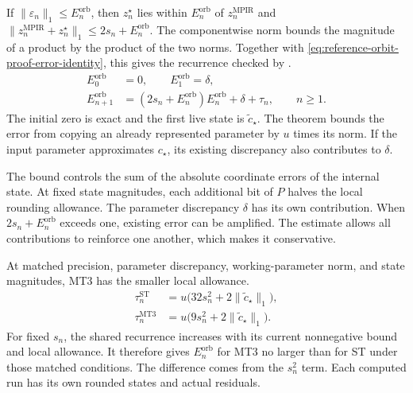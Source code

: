 If \(\lVert\varepsilon_n\rVert_1\le E_n^{\mathrm{orb}}\), then \(z_n^\star\)
lies within \(E_n^{\mathrm{orb}}\) of \(z_n^{\mathrm{MPIR}}\) and
\(\lVert z_n^{\mathrm{MPIR}}+z_n^\star\rVert_1\le 2s_n+E_n^{\mathrm{orb}}\).
The componentwise norm bounds the magnitude of a product by the product of
the two norms. Together with \eqref{eq:reference-orbit-proof-error-identity},
this gives the recurrence checked by .
\begin{equation}
\begin{aligned}
  E_0^{\mathrm{orb}} &= 0, \qquad E_1^{\mathrm{orb}} = \delta, \\
  E_{n+1}^{\mathrm{orb}} &=
    (2s_n+E_n^{\mathrm{orb}})E_n^{\mathrm{orb}}+\delta+\tau_n,
    \qquad n\ge1.
\end{aligned}
\label{eq:reference-orbit-proof-orbit-bound}
\end{equation}
The initial zero is exact and the first live state is \(\widetilde c_\star\).
The theorem  bounds the error from copying an
already represented parameter by \(u\) times its norm. If the input parameter
approximates \(c_\star\), its existing discrepancy also contributes to \(\delta\).

The bound controls the sum of the absolute coordinate errors of the internal
state. At fixed state magnitudes, each additional bit of \(P\) halves the
local rounding allowance. The parameter discrepancy \(\delta\) has its
own contribution. When \(2s_n+E_n^{\mathrm{orb}}\) exceeds one, existing error
can be amplified. The estimate allows all contributions to reinforce one
another, which makes it conservative.

At matched precision, parameter discrepancy, working-parameter norm, and
state magnitudes, MT3 has the smaller local allowance.
\begin{equation}
\begin{aligned}
  \tau_n^{\mathrm{ST}}
    &=u\bigl(32s_n^2+2\lVert\widetilde c_\star\rVert_1\bigr),\\
  \tau_n^{\mathrm{MT3}}
    &=u\bigl(9s_n^2+2\lVert\widetilde c_\star\rVert_1\bigr).
\end{aligned}
\label{eq:reference-orbit-proof-step-budgets}
\end{equation}
For fixed \(s_n\), the shared recurrence increases with its current
nonnegative bound and local allowance. It therefore gives
\(E_n^{\mathrm{orb}}\) for MT3 no larger than for ST under those matched
conditions. The difference comes from the \(s_n^2\) term. Each computed
run has its own rounded states and actual residuals.

